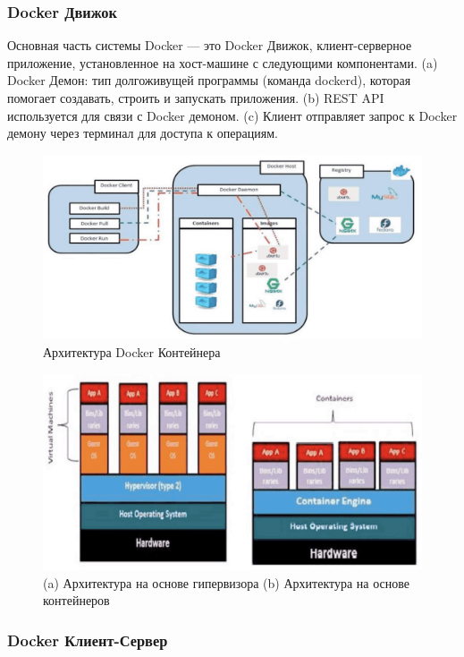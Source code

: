 \documentclass{mirea}
\begin{document}
	\subsubsection{Docker Движок}
	
	Основная часть системы Docker — это Docker Движок, клиент-серверное приложение, установленное на хост-машине с следующими компонентами.
	(a) Docker Демон: тип долгоживущей программы (команда dockerd), которая помогает создавать, строить и запускать приложения.
	(b) REST API используется для связи с Docker демоном.
	(c) Клиент отправляет запрос к Docker демону через терминал для доступа к операциям.
	
	
	\begin{figure}[H]
		\centering
		\includegraphics[width=\textwidth]{img1}
		\parskip=6pt
		\caption{Архитектура Docker Контейнера}
		\label{fig:pic1}
	\end{figure}

	\begin{figure}[H]
		\centering
		\includegraphics[width=\textwidth]{img2}
		\parskip=6pt
		\caption{(a) Архитектура на основе гипервизора (b) Архитектура на основе контейнеров}
		\label{fig:pic2}
	\end{figure}

	\subsubsection{Docker Клиент-Сервер}
	
\end{document}
